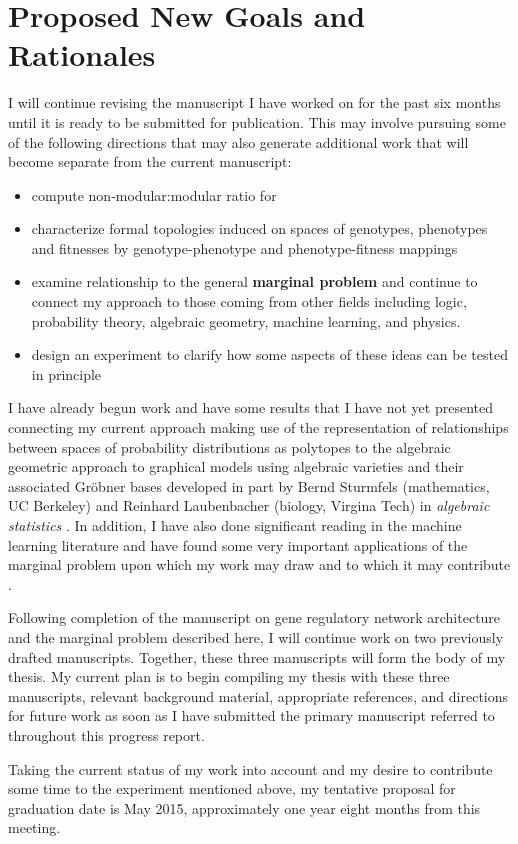 \documentclass[11pt,letterpaper]{article}
\begin{document}
\section{Proposed New Goals and Rationales}
I will continue revising the manuscript I have worked on for the past six months until it is ready to be submitted for publication. This may involve pursuing some of the following directions that may also generate additional work that will become separate from the current manuscript:
\begin{itemize}
\item compute non-modular:modular ratio for
\begin{enumerate}
\end{enumerate}
\item characterize formal topologies induced on spaces of genotypes, phenotypes and fitnesses by genotype-phenotype and phenotype-fitness mappings
\item examine relationship to the general \textbf{marginal problem} and continue to connect my approach to those coming from other fields including logic, probability theory, algebraic geometry, machine learning, and physics.
\item design an experiment to clarify how some aspects of these ideas can be tested in principle
\end{itemize}

I have already begun work and have some results that I have not yet presented connecting my current approach making use of the representation of relationships between spaces of probability distributions as polytopes to the algebraic geometric approach to graphical models using algebraic varieties and their associated Gr\"{o}bner bases developed in part by Bernd Sturmfels (mathematics, UC Berkeley) and Reinhard Laubenbacher (biology, Virgina Tech) in \emph{algebraic statistics} \cite{PachterLior2005}. In addition, I have also done significant reading in the machine learning literature and have found some very important applications of the marginal problem upon which my work may draw and to which it may contribute \cite{Wainwright2007}.

Following completion of the manuscript on gene regulatory network architecture and the marginal problem described here, I will continue work on two previously drafted manuscripts. Together, these three manuscripts will form the body of my thesis. My current plan is to begin compiling my thesis with these three manuscripts, relevant background material, appropriate references, and directions for future work as soon as I have submitted the primary manuscript referred to throughout this progress report. 

Taking the current status of my work into account and my desire to contribute some time to the experiment mentioned above, my tentative proposal for graduation date is May 2015, approximately one year eight months from this meeting.


\end{document}
